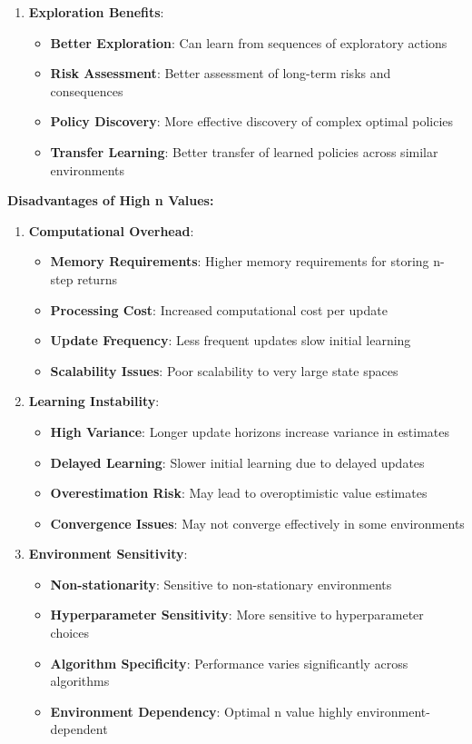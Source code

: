 \documentclass[12pt]{article}
\begin{document}
{{{\begin{enumerate}
    \item \textbf{Exploration Benefits}:
    \begin{itemize}
        \item \textbf{Better Exploration}: Can learn from sequences of exploratory actions
        \item \textbf{Risk Assessment}: Better assessment of long-term risks and consequences
        \item \textbf{Policy Discovery}: More effective discovery of complex optimal policies
        \item \textbf{Transfer Learning}: Better transfer of learned policies across similar environments
    \end{itemize}
\end{enumerate}

\textbf{Disadvantages of High n Values:}

\begin{enumerate}
    \item \textbf{Computational Overhead}:
    \begin{itemize}
        \item \textbf{Memory Requirements}: Higher memory requirements for storing n-step returns
        \item \textbf{Processing Cost}: Increased computational cost per update
        \item \textbf{Update Frequency}: Less frequent updates slow initial learning
        \item \textbf{Scalability Issues}: Poor scalability to very large state spaces
    \end{itemize}
    
    \item \textbf{Learning Instability}:
    \begin{itemize}
        \item \textbf{High Variance}: Longer update horizons increase variance in estimates
        \item \textbf{Delayed Learning}: Slower initial learning due to delayed updates
        \item \textbf{Overestimation Risk}: May lead to overoptimistic value estimates
        \item \textbf{Convergence Issues}: May not converge effectively in some environments
    \end{itemize}
    
    \item \textbf{Environment Sensitivity}:
    \begin{itemize}
        \item \textbf{Non-stationarity}: Sensitive to non-stationary environments
        \item \textbf{Hyperparameter Sensitivity}: More sensitive to hyperparameter choices
        \item \textbf{Algorithm Specificity}: Performance varies significantly across algorithms
        \item \textbf{Environment Dependency}: Optimal n value highly environment-dependent
    \end{itemize}
\end{enumerate}

}}}
\end{document}
